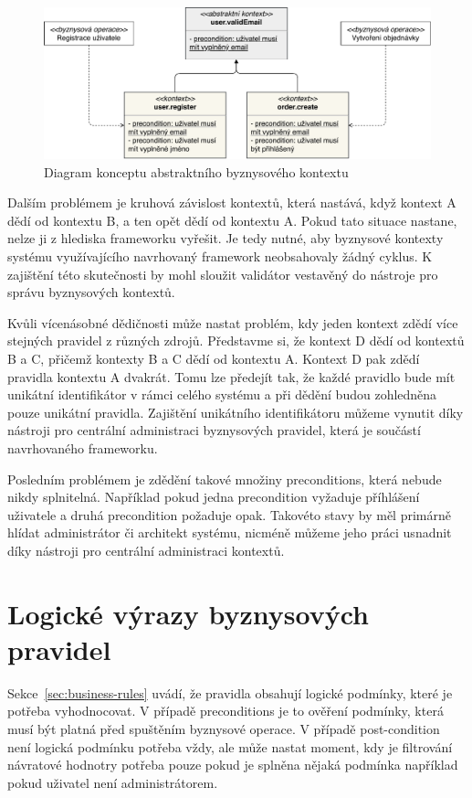 \begin{figure}
    \centering
    \includegraphics[keepaspectratio=true, width=1\linewidth]{figures/abstract-context.pdf}
    \caption{Diagram konceptu abstraktního byznysového kontextu}
    \label{fig:abstract-context}
\end{figure}

Dalším problémem je kruhová závislost kontextů, která nastává, když kontext A dědí od kontextu B,
a ten opět dědí od kontextu A. Pokud tato situace nastane, nelze ji z hlediska frameworku vyřešit.
Je tedy nutné, aby byznysové kontexty systému využívajícího navrhovaný framework neobsahovaly žádný cyklus.
K zajištění této skutečnosti by mohl sloužit validátor vestavěný do nástroje pro správu byznysových kontextů.

Kvůli vícenásobné dědičnosti může nastat problém, kdy jeden kontext zdědí více stejných pravidel z
různých zdrojů. Představme si, že kontext D dědí od kontextů B a C, přičemž kontexty B a C dědí
od kontextu A. Kontext D pak zdědí pravidla kontextu A dvakrát. Tomu lze předejít tak, že
každé pravidlo bude mít unikátní identifikátor v rámci celého systému a při dědění budou zohledněna
pouze unikátní pravidla. Zajištění unikátního identifikátoru můžeme vynutit díky nástroji pro centrální
administraci byznysových pravidel, která je součástí navrhovaného frameworku.

Posledním problémem je zdědění takové množiny preconditions, která nebude nikdy
splnitelná. Například pokud jedna precondition vyžaduje příhlášení uživatele a druhá precondition požaduje
opak. Takovéto stavy by měl primárně hlídat administrátor či architekt systému, nicméně můžeme
jeho práci usnadnit díky nástroji pro centrální administraci kontextů.

\section{Logické výrazy byznysových pravidel}

Sekce~\ref{sec:business-rules} uvádí, že pravidla obsahují logické podmínky, které je
potřeba vyhodnocovat. V případě preconditions je to ověření podmínky, která musí být platná před spuštěním
byznysové operace. V případě post-condition není logická podmínku potřeba vždy, ale může nastat moment,
kdy je filtrování návratové hodnotry potřeba pouze pokud je splněna nějaká podmínka \textendash\xspace
například pokud uživatel není administrátorem.

